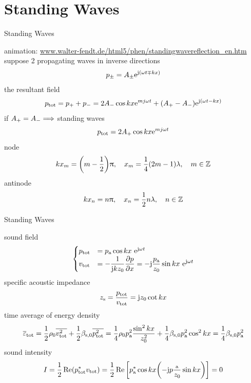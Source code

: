 \documentclass[9pt,mathserif]{beamer}
\begin{document}
\section{Standing Waves}
\begin{frame}{Standing Waves}
	\begin{outline}
		\1 animation: \url{www.walter-fendt.de/html5/phen/standingwavereflection_en.htm}
		\1 suppose 2 propagating waves in inverse directions
		$$p_\pm = A_\pm \mathrm{e}^{\mathrm{j} (\omega t \mp kx )}$$
		\1 the resultant field
		$$ p_\text{tot} = p_+ + p_- = 2A_- \cos kx \mathrm{e}^{mj \omega t}
		+(A_+ - A_- ) \mathrm{e}^{\mathrm{j} (\omega t - kx)}$$
		\1 if $A_+=A_- \Longrightarrow$ standing waves
		$$p_\text{tot} = 2A_+ \cos kx \mathrm{e}^{mj \omega t}$$
		\1 node
		$$kx_m = \qty(m-\frac12)\uppi \qc x_m = \frac14(2m-1)\lambda\qc m\in \Z$$
		\1 antinode
		$$kx_n = n\uppi\qc x_n=\frac12 n\lambda\qc n\in \Z$$
	\end{outline}
\end{frame}

\begin{frame}{Standing Waves}
	\begin{outline}
		\1 sound field
		$$\begin{cases}
			p_\text{tot} & = p_\text{a} \cos kx\ \mathrm{e}^{\mathrm{j} \omega t}\\
			v_\text{tot} & = -\dfrac{1}{\mathrm{j} k z_0}\displaystyle\pdv{p}{x} 
			= -\mathrm{j} \frac{p_\text{a}}{z_0}\sin
			kx\ \mathrm{e}^{\mathrm{j} \omega t}
		\end{cases}
		$$
		\1 specific acoustic impedance
		$$z_\text{s} = \frac{p_\text{tot}}{v_\text{tot}}
		=\mathrm{j} z_0 \cot kx$$
		\1 time average of energy density
		$$\overline{\varepsilon}_\text{tot} = \frac12 \rho_0 \overline{v^2_\text{tot}}
		+\frac12\beta_{\mathrm{s},0} \overline{p^2_\text{tot}}
		=\frac14 \rho_0 p_\text{a}^2 \dfrac{\sin^2 kx}{z_0^2} +
		\frac14 \beta_{\mathrm{s},0} p_\text{a}^2 \cos^2 kx = \frac14
		\beta_\text{s,0} p_\text{a}^2$$
		\1 sound intensity
		$$I = \frac12 \Re(p^*_\text{tot} v_\text{tot}) = \frac12 \Re\qty[p_\text{a}^*
		\cos kx \qty(-\mathrm{j} p\frac{_\text{a}}{z_0} \sin kx)]=0$$

	\end{outline}
\end{frame}
\end{document}
